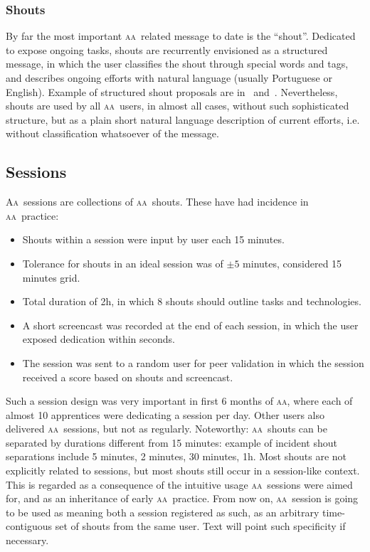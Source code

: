 \documentclass[a4paper, 11pt]{article} %
\newcommand{\aab}{\textsc{aa}}
\newcommand{\aai}{\textsc{Aa}}
\begin{document}
\subsubsection{Shouts}
By far the most important \aab\ related message to date is the ``shout''. Dedicated to expose ongoing tasks, shouts are recurrently envisioned as a structured message, in which the user classifies the shout through special words and tags, and describes ongoing efforts with natural language (usually Portuguese or English). Example of structured shout proposals are in~\cite{aaWiki} and~\cite{aaREADME}. Nevertheless, shouts are used by all \aab\ users, in almost all cases, without such sophisticated structure, but as a plain short natural language description of current efforts, i.e. without classification whatsoever of the message. 

\subsection{Sessions}\label{sec:usess}
\aai\ sessions are collections of \aab\ shouts.
These have had incidence in \aab\ practice:
\begin{itemize}
    \item Shouts within a session were input by user each 15 minutes.
    \item Tolerance for shouts in an ideal session was of $\pm 5$ minutes, considered 15 minutes grid.
    \item Total duration of 2h, in which 8 shouts should outline tasks and technologies.
    \item A short screencast was recorded at the end of each session, in which the user exposed dedication within seconds.
    \item The session was sent to a random user for peer validation in which the session received a score based on shouts and screencast.
\end{itemize}

Such a session design was very important in first 6 months of \aab,
where each of almost 10 apprentices were dedicating a session per day.
Other users also delivered \aab\ sessions, but not as regularly.
Noteworthy: \aab\ shouts can be separated by durations different from 15 minutes: 
example of incident shout separations include 5 minutes, 2 minutes, 30 minutes, 1h.
Most shouts are not explicitly related to sessions, but most shouts still occur in
a session-like context. This is regarded as a consequence of the intuitive usage
\aab\ sessions were aimed for, and as an inheritance of early \aab\ practice.
From now on, \aab\ session is going to be used as meaning both a session registered as such,
as an arbitrary time-contiguous set of shouts from the same user. Text will point such
specificity if necessary.
\end{document}
